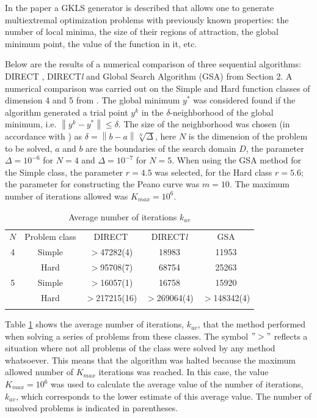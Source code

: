 \documentclass{svproc}
\begin{document}
In the paper \cite{Gaviano2003} a GKLS generator is described that allows one to generate multiextremal optimization problems with previously known properties: the number of local minima, the size of their regions of attraction, the global minimum point, the value of the function in it, etc.

Below are the results of a numerical comparison of three sequential algorithms: DIRECT \cite{Jones2009}, DIRECT\textit{l} \cite{Gablonsky2001} and Global Search Algorithm (GSA) from Section 2.  A numerical comparison was carried out on the Simple and Hard function classes of dimension 4 and 5 from \cite{Gaviano2003}. The global minimum $y^*$ was considered found if the algorithm generated a trial point $y^k$ in the $\delta$-neighborhood of the global minimum, i.e. $\left\| {{y}^{k}}-{{y}^{*}} \right\| \leqslant \delta $.  The size of the neighborhood was chosen (in accordance with \cite{Sergeyev2006}) as $\delta =\left\| b-a \right\|\sqrt[N]{\Delta }$, here $N$ is the dimension of the problem to be solved, $a$ and $b$ are the boundaries  of the search domain $D$, the parameter  $\Delta ={{10}^{-6}}$ for $N=4$ and $\Delta ={{10}^{-7}}$ for $N=5$. When using the GSA method for the Simple class, the parameter $r=4.5$ was selected, for the Hard class $r=5.6$; the parameter for constructing the Peano curve was $m=10$. The maximum number of iterations allowed was $K_{max} = 10^6$.


\begin{table}[t]
	\caption{Average number of iterations $k_{av}$}\label{table:average_iters}
	\center
	\begin{tabular}{ccccc}
		\hline\noalign{\smallskip}
  	 $N$ & Problem class & DIRECT & DIRECT\textit{l} & GSA \\
		\noalign{\smallskip} \hline \noalign{\smallskip}
			4 &	Simple& $>$47282(4) &	18983 &	11953 \\
	      & Hard &	$>$95708(7) &	68754 &	25263 \\
		\noalign{\smallskip}
			5	& Simple &	$>$16057(1) &	16758 &	15920 \\
				& Hard &	$>$217215(16) &	$>$269064(4) & $>$148342(4) \\
		\noalign{\smallskip}\hline
	\end{tabular}
\end{table}


Table \ref{table:average_iters} shows the average number of iterations, $k_{av}$, that the method performed when solving a series of problems from these classes. The symbol \(">"\) reflects a situation where not all problems of the class were solved by any method whatsoever. This means that the algorithm was halted because the maximum allowed number of $K_{max}$ iterations was reached. In this case, the value $K_{max} = 10^6$ was used to calculate the average value of the number of iterations, $k_{av}$, which corresponds to the lower estimate of this average value. The number of unsolved problems is indicated in parentheses.
   
\end{document}
